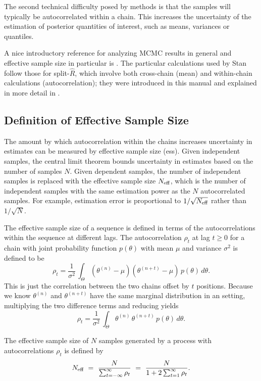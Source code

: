 The second technical difficulty posed by \MCMC methods is that the
samples will typically be autocorrelated within a chain.  This
increases the uncertainty of the estimation of posterior quantities of
interest, such as means, variances or quantiles.

A nice introductory reference for analyzing MCMC results in general
and effective sample size in particular is \citep{Geyer:2011}.  The
particular calculations used by Stan follow those for split-$\hat{R}$,
which involve both cross-chain (mean) and within-chain calculations
(autocorrelation); they were introduced in this manual and explained
in more detail in \citep{GelmanEtAl:2013}.

\subsection{Definition of Effective Sample Size}

The amount by which autocorrelation within the chains increases
uncertainty in estimates can be measured by effective sample size
({\sc ess}).  Given independent samples, the central limit theorem
bounds uncertainty in estimates based on the number of samples $N$.
Given dependent samples, the number of independent samples is replaced
with the effective sample size $N_{\mbox{\scriptsize eff}}$, which is
the number of independent samples with the same estimation power as
the $N$ autocorrelated samples.  For example, estimation error is
proportional to $1/\sqrt{N_{\mbox{\scriptsize eff}}}$ rather than
$1/\sqrt{N}$.

The effective sample size of a sequence is defined in terms of the
autocorrelations within the sequence at different lags.  The
autocorrelation $\rho_t$ at lag $t \geq 0$ for a chain with joint
probability function $p(\theta)$ with mean $\mu$ and variance
$\sigma^2$ is defined to be
\[
\rho_t
=
\frac{1}{\sigma^2} \, \int_{\Theta} (\theta^{(n)} - \mu)
(\theta^{(n+t)} - \mu) \, p(\theta) \, d\theta.
\]
This is just the correlation between the two chains offset by $t$
positions.  Because we know $\theta^{(n)}$ and $\theta^{(n+t)}$ have
the same marginal distribution in an \MCMC setting, multiplying the
two difference terms and reducing yields
\[
\rho_t
=
\frac{1}{\sigma^2} \, \int_{\Theta} \theta^{(n)} \, \theta^{(n+t)} \, p(\theta) \, d\theta.
\]

The effective sample size of $N$ samples generated by a process with
autocorrelations $\rho_t$ is defined by
\[
N_{\mbox{\scriptsize eff}}
\ = \
\frac{N}{\sum_{t = -\infty}^{\infty} \rho_t}
\ = \
\frac{N}{1 + 2 \sum_{t = 1}^{\infty} \rho_t}.
\]

